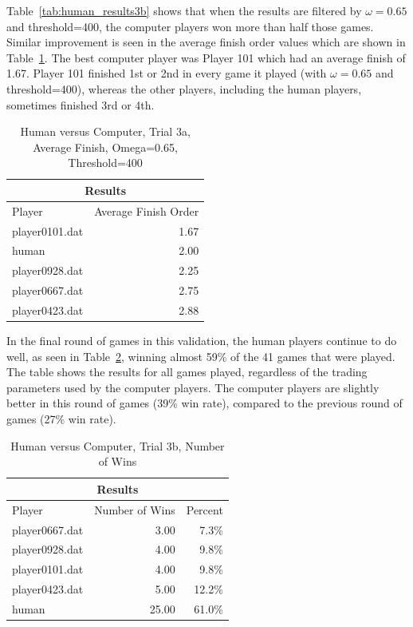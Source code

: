 Table~\ref{tab:human_results3b} shows that when the results are filtered by
\(\omega=0.65\) and threshold=400, the computer players won more than half those
games. Similar improvement is seen in the average finish order values which are
shown in Table~\ref{tab:human_results3c}. The best computer player was Player
101 which had an average finish of 1.67. Player 101 finished 1st or 2nd in every
game it played (with \(\omega=0.65\) and threshold=400), whereas the other
players, including the human players, sometimes finished 3rd or 4th.

\begin{table}[htbp]
  \centering \caption[Human versus Computer, Trial 3a, Average Finish]{Human
  versus Computer, Trial 3a, Average Finish, Omega=0.65, Threshold=400}
    \begin{tabular}{lr}
    \toprule
    \multicolumn{2}{c}{Results}  \\
    \midrule
    Player & Average Finish Order \\
 \midrule
    \multicolumn{1}{l}{player0101.dat} & 1.67 \\
    \multicolumn{1}{l}{human} & 2.00 \\
    \multicolumn{1}{l}{player0928.dat} & 2.25 \\
    \multicolumn{1}{l}{player0667.dat} & 2.75 \\
    \multicolumn{1}{l}{player0423.dat} & 2.88 \\
    \bottomrule
    \end{tabular}%
  \label{tab:human_results3c}%
\end{table}%

In the final round of games in this validation, the human players continue to
do well, as seen in Table~\ref{tab:human_results3d}, winning almost 59\% of the
41 games that were played. The table shows the results for all games played,
regardless of the trading parameters used by the computer players. The computer
players are slightly better in this round of games (39\% win rate), compared to
the previous round of games (27\% win rate).

\begin{table}[htbp]
  \centering
  \caption{Human versus Computer, Trial 3b, Number of Wins}
    \begin{tabular}{lrr}
    \toprule
    \multicolumn{3}{c}{Results}  \\
    \midrule
    Player & Number of Wins & Percent \\
 \midrule
    \multicolumn{1}{l}{player0667.dat} & 3.00   & 7.3\% \\
    \multicolumn{1}{l}{player0928.dat} & 4.00   & 9.8\% \\
    \multicolumn{1}{l}{player0101.dat} & 4.00   & 9.8\% \\
    \multicolumn{1}{l}{player0423.dat} & 5.00   & 12.2\% \\
    \multicolumn{1}{l}{human} & 25.00  & 61.0\% \\
    \bottomrule
    \end{tabular}%
  \label{tab:human_results3d}%
\end{table}%

